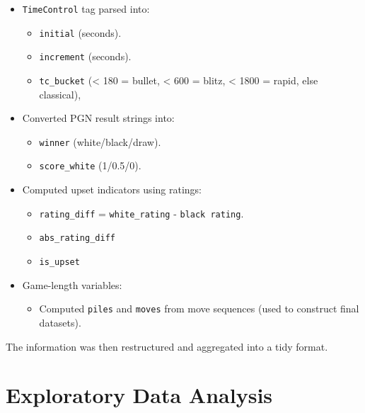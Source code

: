 \documentclass[
  12pt]{article}
\providecommand{\tightlist}{%
  \setlength{\itemsep}{0pt}\setlength{\parskip}{0pt}}\usepackage{longtable,booktabs,array}
\begin{document}
\begin{itemize}
\tightlist
\item
  \texttt{TimeControl} tag parsed into:

  \begin{itemize}
  \tightlist
  \item
    \texttt{initial} (seconds).
  \item
    \texttt{increment} (seconds).
  \item
    \texttt{tc\_bucket} (\textless{} 180 = bullet, \textless{} 600 =
    blitz, \textless{} 1800 = rapid, else classical),
  \end{itemize}
\item
  Converted PGN result strings into:

  \begin{itemize}
  \tightlist
  \item
    \texttt{winner} (white/black/draw).
  \item
    \texttt{score\_white} (1/0.5/0).
  \end{itemize}
\item
  Computed upset indicators using ratings:

  \begin{itemize}
  \tightlist
  \item
    \texttt{rating\_diff} = \texttt{white\_rating} -
    \texttt{black\ rating}.
  \item
    \texttt{abs\_rating\_diff}
  \item
    \texttt{is\_upset}
  \end{itemize}
\item
  Game-length variables:

  \begin{itemize}
  \tightlist
  \item
    Computed \texttt{piles} and \texttt{moves} from move sequences (used
    to construct final datasets).
  \end{itemize}
\end{itemize}

The information was then restructured and aggregated into a tidy format.

\section{Exploratory Data Analysis}\label{sec-eda}
\end{document}
